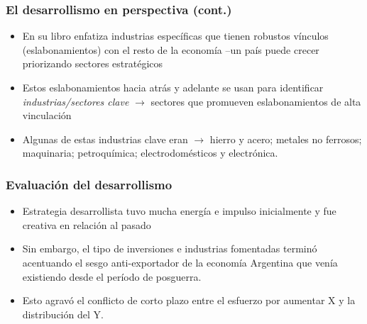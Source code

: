 \documentclass[14pt,aspectratio=169]{beamer}
\begin{document}
 \begin{frame}\frametitle{El desarrollismo en perspectiva (cont.)}
    \begin{itemize}\itemsep 10pt
      \item En su libro enfatiza industrias específicas que tienen
        robustos vínculos (eslabonamientos) con el resto de la
        economía --un país puede crecer priorizando sectores
        estratégicos
        \item Estos eslabonamientos hacia atrás y adelante se usan
          para identificar \textit{industrias/sectores clave}
          $\longrightarrow$ sectores que promueven eslabonamientos de
          alta vinculación
          \item Algunas de estas industrias clave eran
            $\longrightarrow$ hierro y acero; metales no ferrosos;
            maquinaria; petroquímica; electrodomésticos y
            electrónica. 
                        \end{itemize}
               \end{frame}



\begin{frame}\frametitle{Evaluación del desarrollismo}
                 \begin{itemize}\itemsep 5pt \medskip
                 \item Estrategia desarrollista tuvo mucha energía e
                   impulso inicialmente y fue creativa en relación al
                   pasado
                   \item Sin embargo, el tipo de inversiones e
                     industrias fomentadas terminó acentuando el sesgo
                     anti-exportador de la economía Argentina que
                     venía existiendo desde el período de posguerra.
                     \item Esto agravó el conflicto de corto plazo
                       entre el esfuerzo por aumentar X y la
                       distribución del Y. 
                   \end{itemize}
               \end{frame}
\end{document}
